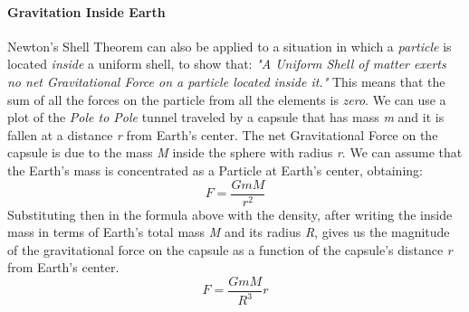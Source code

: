 \documentclass{scrartcl}
\begin{document}
	\paragraph{Gravitation Inside Earth} Newton's Shell Theorem can also be applied to a situation in which a {\em particle} is located {\em inside} a uniform shell, to show that: \newline
								{\em"A Uniform Shell of matter exerts no net Gravitational Force on a particle located inside it."} \newline
								This means that the sum of all the forces on the particle from all the elements is {\em zero}. 
								We can use a plot of the {\em Pole to Pole} tunnel traveled by a capsule that has mass {\em m}  and it is fallen at a distance {\em r} from Earth's center. The net Gravitational Force on the 									capsule is due to the mass {\em  M} inside the sphere with radius {\em r}. We can assume that the Earth's mass is concentrated as a Particle at Earth's center, obtaining:   
								 \begin{equation}
						     		 {F} =  \frac{GmM}{r^2} 
						     		 \end{equation}
								 Substituting then in the formula above with the density, after writing the inside mass in terms of Earth's total mass {\em M } and its radius {\em R}, gives us the magnitude of the gravitational force 								on the capsule as a function of the capsule's distance {\em r} from Earth's center. 	
								\begin{equation}
						     		 {F} =  \frac{GmM}{R^3} r 
						     		 \end{equation}		
\end{document}
